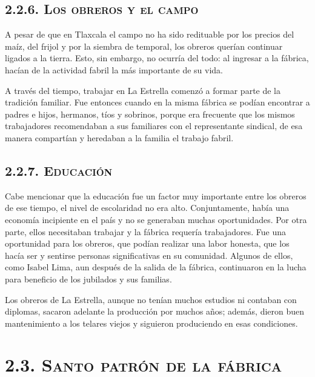 \documentclass[14pt,letterpaper,twoside]{extbook} %
\begin{document}
\subsection*{\mdseries\large\textsc{2.2.6. Los obreros y el campo}}

\noindent A pesar de que en Tlaxcala el campo no ha sido redituable por los precios del maíz, del frijol y por la siembra de temporal, los obreros querían continuar ligados a la tierra. Esto, sin embargo, no ocurría del todo: al ingresar a la fábrica, hacían de la actividad fabril la más importante de su vida.

A través del tiempo, trabajar en La Estrella comenzó a formar parte de la tradición familiar. Fue entonces cuando en la misma fábrica se podían encontrar a padres e hijos, hermanos, tíos y sobrinos, porque era frecuente que los mismos trabajadores recomendaban a sus familiares con el representante sindical, de esa manera compartían y heredaban a la familia el trabajo fabril.

\subsection*{\mdseries\large\textsc{2.2.7. Educación}}

\noindent Cabe mencionar que la educación fue un factor muy importante entre los obreros de ese tiempo, el nivel de escolaridad no era alto. Conjuntamente, había una economía incipiente en el país y no se generaban muchas oportunidades. Por otra parte, ellos necesitaban trabajar y
la fábrica requería trabajadores. Fue una oportunidad para los obreros, que podían realizar una labor honesta, que los hacía ser y sentirse personas significativas en su comunidad. Algunos de ellos, como Isabel Lima, aun después de la salida de la fábrica, continuaron en la lucha para beneficio de los jubilados y sus familias.

Los obreros de La Estrella, aunque no tenían muchos estudios ni contaban con diplomas, sacaron adelante la producción por muchos años; además, dieron buen mantenimiento a los telares viejos y siguieron produciendo en esas condiciones.

\section*{\mdseries\large\textsc{2.3. Santo patrón de la fábrica}}
\end{document}
